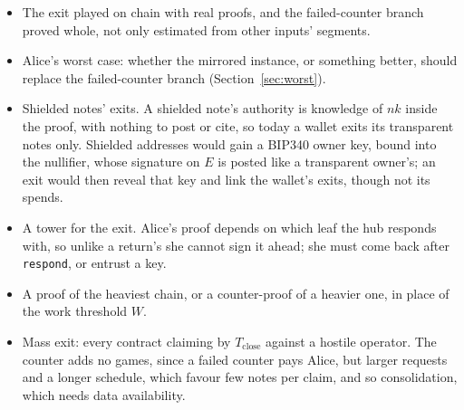 \documentclass[11pt]{article}
\newcommand{\Tc}{T_{\mathrm{close}}}
\newcommand{\tx}[1]{\texttt{#1}}
\begin{document}
\begin{itemize}[leftmargin=1.5em]
\item The exit played on chain with real proofs, and the failed-counter
  branch proved whole, not only estimated from other inputs' segments.
\item Alice's worst case: whether the mirrored instance, or something
  better, should replace the failed-counter branch
  (Section~\ref{sec:worst}).
\item Shielded notes' exits. A shielded note's authority is knowledge of
  $\mathit{nk}$ inside the proof, with nothing to post or cite, so today
  a wallet exits its transparent notes only. Shielded addresses would
  gain a BIP340 owner key, bound into the nullifier, whose signature on
  $E$ is posted like a transparent owner's; an exit would then reveal
  that key and link the wallet's exits, though not its spends.
\item A tower for the exit. Alice's proof depends on which leaf the hub
  responds with, so unlike a return's she cannot sign it ahead; she
  must come back after \tx{respond}, or entrust a key.
\item A proof of the heaviest chain, or a counter-proof of a heavier one,
  in place of the work threshold $W$.
\item Mass exit: every contract claiming by $\Tc$ against a hostile
  operator. The counter adds no games, since a failed counter pays
  Alice, but larger requests and a longer schedule, which favour few
  notes per claim, and so consolidation, which needs data availability.
\end{itemize}
\end{document}
